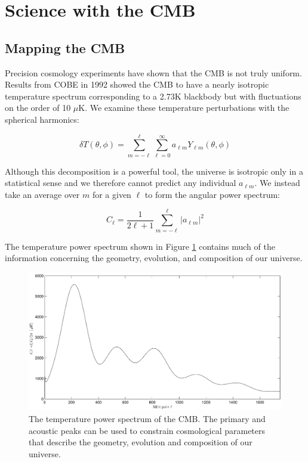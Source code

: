 \documentclass[12pt]{article}
\begin{document}
\section{Science with the CMB}

\subsection{Mapping the CMB}
Precision cosmology experiments have shown that the CMB is not truly uniform.
Results from COBE in 1992\cite{cite:COBE} showed the CMB to have a nearly
isotropic temperature spectrum corresponding to a 2.73K blackbody but with
fluctuations on the order of 10 $\mu$K. We examine these temperature
perturbations with the spherical harmonics:


\begin{equation}
	\delta T(\theta,\phi) = \sum _{m=-\ell} ^\ell \sum _{\ell=0} ^\infty
	a_{\ell m}Y_{\ell m}(\theta,\phi)
\end{equation}


Although this decomposition is a powerful tool, the universe is isotropic only
in a statistical sense and we therefore cannot predict any individual $a_{\ell
m}$. We instead take an average over $m$ for a given $\ell$ to form the
angular power spectrum:

\begin{equation}
	C_{\ell} = \frac{1}{2\ell +1}\sum _{m=-\ell} ^\ell |a_{\ell m}|^2
\end{equation}


The temperature power spectrum shown in Figure \ref{fig:temp_aps} contains
much of the information concerning the geometry, evolution, and composition of
our universe.
\begin{figure}
	\center
	\includegraphics[width=.8\textwidth]{temp_aps.pdf}
	\caption{The temperature power spectrum of the CMB. The primary and
	acoustic peaks can be used to constrain cosmological parameters that
	describe the geometry, evolution and composition of our universe.}
	\label{fig:temp_aps}

\end{figure}
\end{document}
